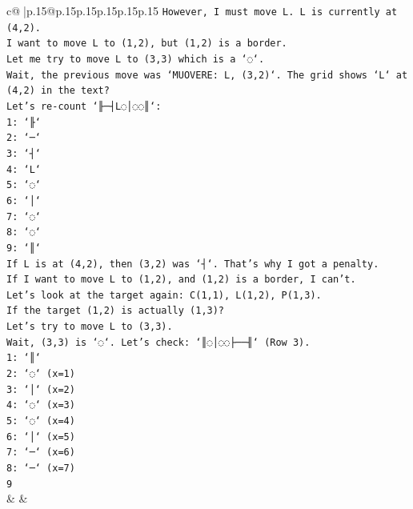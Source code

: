 \documentclass{article}
\begin{document}
{\begin{supertabular}{c@{$\;$}|p{.15\linewidth}@{}p{.15\linewidth}p{.15\linewidth}p{.15\linewidth}p{.15\linewidth}p{.15\linewidth}}
{{{\texttt{However, I must move L. L is currently at (4,2).} \\
\texttt{I want to move L to (1,2), but (1,2) is a border.} \\
\texttt{Let me try to move L to (3,3) which is a `◌`.} \\
\texttt{Wait, the previous move was `MUOVERE: L, (3,2)`. The grid shows `L` at (4,2) in the text?} \\
\texttt{Let's re{-}count `╟─┤L◌│◌◌║`:} \\
\texttt{1: `╟`} \\
\texttt{2: `─`} \\
\texttt{3: `┤`} \\
\texttt{4: `L`} \\
\texttt{5: `◌`} \\
\texttt{6: `│`} \\
\texttt{7: `◌`} \\
\texttt{8: `◌`} \\
\texttt{9: `║`} \\
\texttt{If L is at (4,2), then (3,2) was `┤`. That's why I got a penalty.} \\
\texttt{If I want to move L to (1,2), and (1,2) is a border, I can't.} \\
\texttt{Let's look at the target again: C(1,1), L(1,2), P(1,3).} \\
\texttt{If the target (1,2) is actually (1,3)?} \\
\texttt{Let's try to move L to (3,3).} \\
\texttt{Wait, (3,3) is `◌`. Let's check: `║◌│◌◌├──╢` (Row 3).} \\
\texttt{1: `║`} \\
\texttt{2: `◌` (x=1)} \\
\texttt{3: `│` (x=2)} \\
\texttt{4: `◌` (x=3)} \\
\texttt{5: `◌` (x=4)} \\
\texttt{6: `│` (x=5)} \\
\texttt{7: `─` (x=6)} \\
\texttt{8: `─` (x=7)} \\
\texttt{9} \\
            }
        }
    }
    & & \\ \\


\end{supertabular}}
\end{document}
